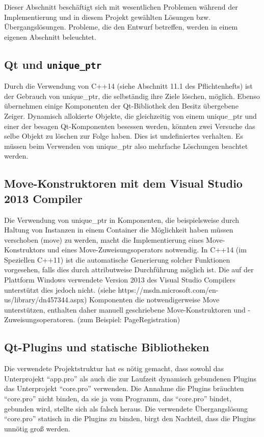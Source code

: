 Dieser Abschnitt beschäftigt sich mit wesentlichen Problemen während der 
Implementierung und in diesem Projekt gewählten Lösungen bzw. Übergangslösungen.
Probleme, die den Entwurf betreffen, werden in einem eigenen Abschnitt beleuchtet.

\subsection{Qt und \texttt{unique\_ptr}}
Durch die Verwendung von C++14 (siehe Abschnitt 11.1 des Pflichtenhefts) ist der Gebrauch von unique\_ptr, die selbständig ihre Ziele löschen, möglich. Ebenso übernehmen einige Komponenten der Qt-Bibliothek den Besitz übergebene Zeiger. Dynamisch allokierte Objekte, die gleichzeitig von einem unique\_ptr und einer der besagen Qt-Komponenten besessen werden, könnten zwei Versuche das selbe Objekt zu löschen zur Folge haben. Dies ist undefiniertes verhalten. Es müssen beim Verwenden von unique\_ptr also mehrfache Löschungen beachtet werden.

\subsection{Move-Konstruktoren mit dem Visual Studio 2013 Compiler}
Die Verwendung von unique\_ptr in Komponenten, die beispielsweise durch Haltung von Instanzen in einem Container die Möglichkeit haben müssen verschoben (move) zu werden, macht die Implementierung eines Move-Konstruktors und eines Move-Zuweisungsoperators notwendig. In C++14 (im Speziellen C++11) ist die automatische Generierung solcher Funktionen vorgesehen, falls dies durch attributweise Durchführung möglich ist. Die auf der Plattform Windows verwendete Version 2013 des Visual Studio Compilers unterstützt dies jedoch nicht. (siehe https://msdn.microsoft.com/en-us/library/dn457344.aspx)
Komponenten die notwendigerweise Move unterstützen, enthalten daher manuell geschriebene Move-Konstruktoren und -Zuweisungsoperatoren. (zum Beispiel: PageRegistration)

\subsection{Qt-Plugins und statische Bibliotheken}
Die verwendete Projektstruktur hat es nötig gemacht, dass sowohl das Unterprojekt \enquote{app.pro} als auch die zur Laufzeit dynamisch gebundenen Plugins das Unterprojekt \enquote{core.pro} verwenden.
Die Annahme die Plugins bräuchten \enquote{core.pro} nicht binden, da sie ja vom Programm, das \enquote{core.pro} bindet, gebunden wird, stellte sich als falsch heraus.
Die verwendete Übergangslösung \enquote{core.pro} statisch in die Plugins zu binden, birgt den Nachteil, dass die Plugins unnötig groß werden.
